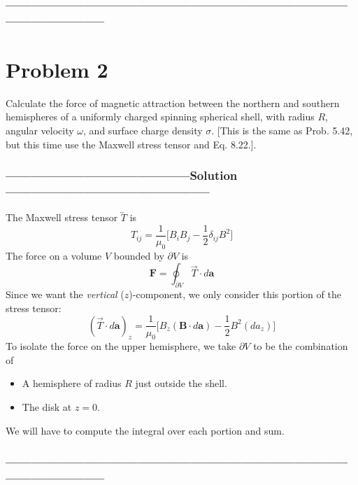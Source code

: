 \documentclass[a4paper,12pt]{article} %
\begin{document}
\subsubsection*{-----------------------------------------------------------------------------------------------------}

\section*{Problem 2}
Calculate the force of magnetic attraction between the northern and southern hemispheres of a uniformly charged spinning spherical shell, with radius $R$, angular velocity $\omega$, and surface charge density $\sigma$. [This is the same as Prob. 5.42, but this time use the Maxwell stress tensor and Eq. 8.22.].
\subsubsection*{------------------------------------------Solution-----------------------------------------------}
The Maxwell stress tensor $\overleftrightarrow{T}$ is
$$
T_{ij} = \frac{1}{\mu_0}\Big[B_i B_j - \frac{1}{2}\delta_{ij}B^2\Big]
$$
The force on a volume $V$ bounded by $\partial V$ is
$$
\mathbf{F}=\oint_{\partial V} \overrightarrow{T} \cdot d\mathbf{a}
$$
Since we want the \emph{vertical} ($z$)-component, we only consider this portion of the stress tensor:
$$
(\overrightarrow{T}\cdot d\mathbf{a})_z =\frac{1}{\mu_0} \Big[B_z (\mathbf{B}\cdot d\mathbf{a})-\frac{1}{2}B^2(d a_z)\Big]
$$
  To isolate the force on the upper hemisphere, we take \(\partial V\) to be the combination of
\begin{itemize}
\item A hemisphere of radius $R$ just outside the shell.
\item The disk at $z=0$.
\end{itemize}
We will have to compute the integral over each portion and sum.\\
\subsubsection*{-----------------------------------------------------------------------------------------------------}
\end{document}

